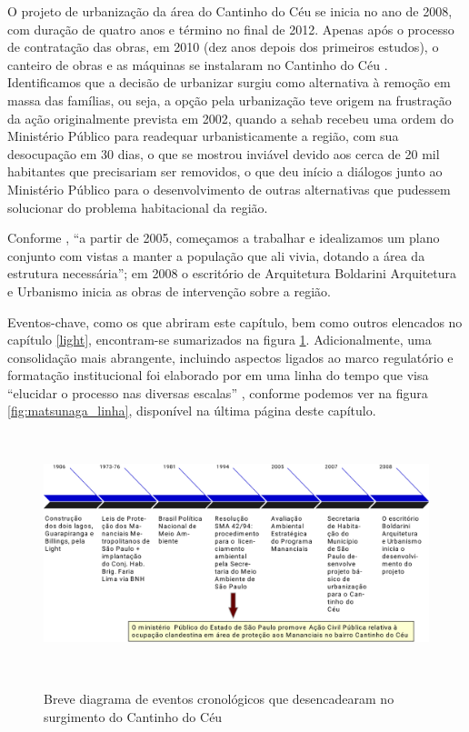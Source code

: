 	O projeto de urbanização da área do Cantinho do Céu se inicia no ano de 2008, com duração de quatro anos e término no final de 2012. Apenas após o processo de contratação das obras, em 2010 (dez anos depois dos primeiros estudos), o canteiro de obras e as máquinas se instalaram no Cantinho do Céu \cite{Barda2012}. Identificamos que a decisão de urbanizar surgiu como alternativa à remoção em massa das famílias, ou seja, a opção pela urbanização teve origem na frustração da ação originalmente prevista em 2002, quando a \gls{sehab} recebeu uma ordem do Ministério Público para readequar urbanisticamente a região, com sua desocupação em 30 dias, o que se mostrou inviável devido aos cerca de 20 mil habitantes que precisariam ser removidos, o que deu início a diálogos junto ao Ministério Público para o desenvolvimento de outras alternativas que pudessem solucionar do problema habitacional da região. \cite[p.21]{Barda2012}
	
	Conforme , ``a partir de 2005, começamos a trabalhar e idealizamos um plano conjunto com vistas a manter a população que ali vivia, dotando a área da estrutura necessária''; em 2008 o escritório de Arquitetura  Boldarini Arquitetura e Urbanismo inicia as obras de intervenção sobre a região.

	Eventos-chave, como os que abriram este capítulo, bem como outros elencados no capítulo \ref{light}, encontram-se sumarizados na figura \ref*{fig:cronologia}. Adicionalmente, uma consolidação mais abrangente, incluindo aspectos ligados ao marco regulatório e formatação institucional foi elaborado por  em uma linha do tempo que visa ``elucidar o processo nas diversas escalas'' \cite[p.37]{Matsunaga2015}, conforme podemos ver na figura \ref*{fig:matsunaga_linha}, disponível na última página deste capítulo.
	
	\begin{figure}[htb]
		\centering
		\caption[Cronologia do surgimento do Cantinho do Céu]{Breve diagrama de eventos cronológicos que desencadearam no surgimento do Cantinho do Céu}
		\includegraphics[height=7cm]{img/cronologia}
		\label{fig:cronologia}
	\end{figure}
	
